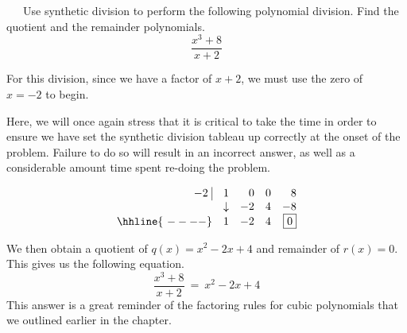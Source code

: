 \begin{example}~~~Use synthetic division to perform the following polynomial division.  Find the quotient and the remainder polynomials.
$$\frac{x^3+8}{x+2}$$

For this division, since we have a factor of $x+2$, we must use the zero of\\
$x = -2$ to begin.

Here, we will once again stress that it is critical to take the time in order to ensure we have set the synthetic division tableau up correctly at the onset of the problem.  Failure to do so will result in an incorrect answer, as well as a considerable amount time spent re-doing the problem.

\[ \begin{array}{rrrrr}


  -2 \, \, \vline& 1 & 0 & 0  & 8 \\

   & \downarrow &  -2  &  4  & -8 \\ \hhline{~----} 
  & 1  &   -2  & 4  &  \fbox{$0$}  \\  
\end{array}\]

We then obtain a quotient of $q(x) = x^2-2x+4$ and remainder of $r(x) =0$. This gives us the following equation.
$$\frac{x^3+8}{x+2}~=~x^2-2x+4$$
This answer is a great reminder of the factoring rules for cubic polynomials that we outlined earlier in the chapter.
\end{example}


